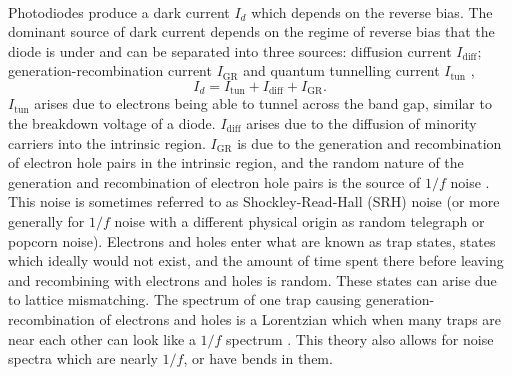 \paragraph{}
Photodiodes produce a dark current $I_d$ which depends on the reverse bias. The dominant source of dark current depends on the regime of reverse bias that the diode is under and can be separated into three sources: diffusion current $I_{\mathrm{diff}}$; generation-recombination current $I_{\mathrm{GR}}$ and quantum tunnelling current $I_{\mathrm{tun}}$ \cite{Forrest1981},
\begin{equation}
I_d = I_{\mathrm{tun}} + I_{\mathrm{diff}} + I_{\mathrm{GR}}.
\end{equation}
$I_{\mathrm{tun}}$ arises due to electrons being able to tunnel across the band gap, similar to the breakdown voltage of a diode. $I_{\mathrm{diff}}$ arises due to the diffusion of minority carriers into the intrinsic region. $I_{\mathrm{GR}}$ is due to the generation and recombination of electron hole pairs in the intrinsic region, and the random nature of the generation and recombination of electron hole pairs is the source of $1/f$ noise \cite{Seifert2010}. This noise is sometimes referred to as Shockley-Read-Hall (SRH) noise (or more generally for $1/f$ noise with a different physical origin as random telegraph or popcorn noise). Electrons and holes enter what are known as trap states, states which ideally would not exist, and the amount of time spent there before leaving and recombining with electrons and holes is random. These states can arise due to lattice mismatching. The spectrum of one trap causing generation-recombination of electrons and holes is a Lorentzian which when many traps are near each other can look like a $1/f$ spectrum \cite{Klumperink}\cite{Machlup1954}\cite{Hooge1981}. This theory also allows for noise spectra which are nearly $1/f$, or have bends in them.
